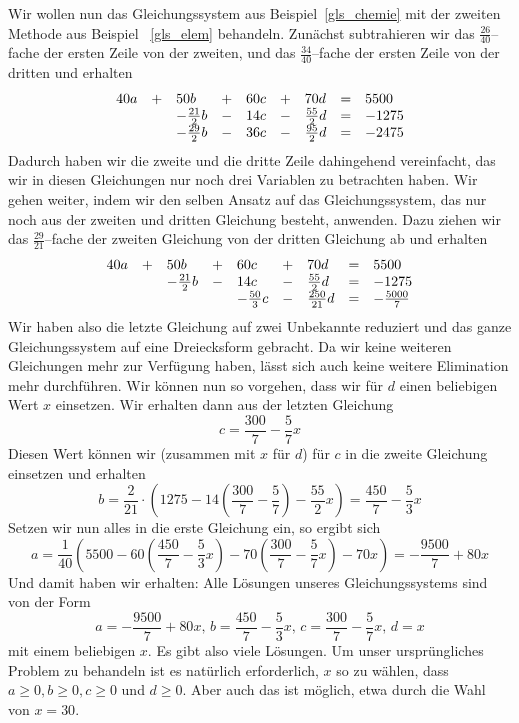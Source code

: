 \begin{beispiel}\label{gls_chem_lsg} Wir wollen nun das Gleichungssystem aus Beispiel~\ref{gls_chemie} mit 
der zweiten Methode aus 
Beispiel ~\ref{gls_elem} behandeln. Zunächst subtrahieren wir das $\frac {26}{40}$--fache der ersten Zeile von 
der zweiten, und das $\frac {34}{40}$--fache der ersten Zeile von der dritten und erhalten 
  $$ \begin{array} {l c l c l c l c l}
   40 a & + & 50 b & + & 60 c & + & 70 d & = & 5500 \\
     &   & -\frac {21}{2} b & - & 14 c & - & \frac {55}{2} d & = & -1275 \\
     &   & - \frac {29}{2} b & - & 36 c & - & \frac {95}{2} d & = & -2475 
   \end{array} $$
Dadurch haben wir die zweite und die dritte Zeile dahingehend vereinfacht, das wir in diesen Gleichungen nur noch 
drei Variablen zu betrachten haben. Wir gehen weiter, indem wir den selben Ansatz auf das Gleichungssystem, das nur 
noch aus der zweiten und dritten Gleichung besteht, anwenden. Dazu ziehen wir das $\frac {29}{21}$--fache der 
zweiten Gleichung von der dritten Gleichung ab und erhalten
  $$ \begin{array} {l c l c l c l c l}
   40 a & + & 50 b & + & 60 c & + & 70 d & = & 5500 \\
     &   & -\frac {21}{2} b & - & 14 c & - & \frac {55}{2} d & = & -1275 \\
     &   &   &   & - \frac {50}{3} c & - & \frac {250}{21} d & = & -\frac {5000}{7}  
   \end{array} $$
Wir haben also die letzte Gleichung auf zwei Unbekannte reduziert und das ganze Gleichungssystem auf eine 
Dreiecksform gebracht. Da wir keine weiteren Gleichungen mehr zur 
Verfügung haben, lässt sich auch keine weitere Elimination mehr durchführen. Wir können nun so vorgehen, 
dass wir für $d$ einen beliebigen Wert $x$ einsetzen. Wir erhalten dann aus der letzten Gleichung
  $$ c = \frac {300}{7} - \frac {5}{7} x $$
Diesen Wert können wir (zusammen mit $x$ für $d$) für $c$ in die zweite Gleichung einsetzen und erhalten
  $$ b = \frac {2}{21} \cdot \left( 1275 - 14 \left( \frac {300}{7} -\frac {5}{7} \right) - \frac {55}{2} x \right)
       = \frac {450}{7} - \frac {5}{3} x $$
Setzen wir nun alles in die erste Gleichung ein, so ergibt sich
  $$ a = \frac {1}{40} \left( 5500 - 60 \left( \frac {450}{7} - \frac {5}{3} x \right) - 70 \left( 
         \frac {300}{7} - \frac {5}{7} x \right) - 70 x \right) 
       = - \frac {9500}{7} + 80 x$$
Und damit haben wir erhalten: Alle Lösungen unseres Gleichungssystems sind von der Form
  $$ a = - \frac {9500}{7} + 80 x, \, b = \frac {450}{7} - \frac {5}{3} x, \, 
     c = \frac {300}{7} - \frac {5}{7} x, \, d = x $$
mit einem beliebigen $x$. Es gibt also viele Lösungen. Um unser ursprüngliches Problem zu behandeln ist es 
natürlich erforderlich, $x$ so zu wählen, dass $a \geq 0, b \geq 0, c \geq 0$ und $d \geq 0$. Aber auch das 
ist möglich, etwa durch die Wahl von $x = 30$.
\end{beispiel}


